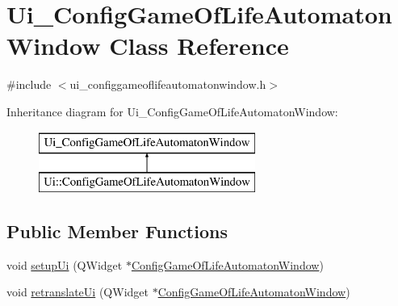 \hypertarget{class_ui___config_game_of_life_automaton_window}{}\section{Ui\+\_\+\+Config\+Game\+Of\+Life\+Automaton\+Window Class Reference}
\label{class_ui___config_game_of_life_automaton_window}


{\ttfamily \#include $<$ui\+\_\+configgameoflifeautomatonwindow.\+h$>$}

Inheritance diagram for Ui\+\_\+\+Config\+Game\+Of\+Life\+Automaton\+Window\+:\begin{figure}[H]
\begin{center}
\leavevmode
\includegraphics[height=2.000000cm]{class_ui___config_game_of_life_automaton_window}
\end{center}
\end{figure}
\subsection*{Public Member Functions}
\begin{DoxyCompactItemize}
\item 
void \mbox{\hyperlink{class_ui___config_game_of_life_automaton_window_a0642d9a10f4bca0336a460c82d23e603}{setup\+Ui}} (Q\+Widget $\ast$\mbox{\hyperlink{class_config_game_of_life_automaton_window}{Config\+Game\+Of\+Life\+Automaton\+Window}})
\item 
void \mbox{\hyperlink{class_ui___config_game_of_life_automaton_window_adaefd039def47107d6a97580ada91acb}{retranslate\+Ui}} (Q\+Widget $\ast$\mbox{\hyperlink{class_config_game_of_life_automaton_window}{Config\+Game\+Of\+Life\+Automaton\+Window}})
\end{DoxyCompactItemize}
